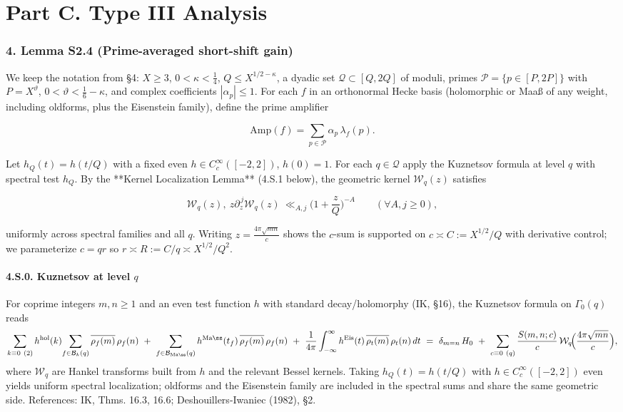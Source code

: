 \documentclass[11pt]{article}
\theoremstyle{definition}
\theoremstyle{remark}
\begin{document}
\part*{Part C. Type III Analysis}

\section*{4. Lemma S2.4 (Prime-averaged short-shift gain)}
We keep the notation from §4: $X\ge 3$, $0<\kappa<\tfrac14$, $Q\le X^{1/2-\kappa}$, a dyadic set $\mathcal Q\subset[Q,2Q]$ of moduli, primes $\mathcal P=\{p\in[P,2P]\}$ with $P=X^\vartheta$, $0<\vartheta<\tfrac16-\kappa$, and complex coefficients $|\alpha_p|\le 1$. For each $f$ in an orthonormal Hecke basis (holomorphic or Maaß of any weight, including oldforms, plus the Eisenstein family), define the prime amplifier

$$
\mathrm{Amp}(f)=\sum_{p\in\mathcal P}\alpha_p\,\lambda_f(p).
$$

Let $h_Q(t)=h(t/Q)$ with a fixed even $h\in C_c^\infty([-2,2])$, $h(0)=1$. For each $q\in\mathcal Q$ apply the Kuznetsov formula at level $q$ with spectral test $h_Q$. By the **Kernel Localization Lemma** (4.S.1 below), the geometric kernel $\mathcal W_q(z)$ satisfies

$$
\mathcal W_q(z),\ z\partial_z^{\,j}\mathcal W_q(z)\ \ll_{A,j}\Big(1+\frac zQ\Big)^{-A}\qquad(\forall A,j\ge0),
$$

uniformly across spectral families and all $q$. Writing $z=\frac{4\pi\sqrt{mn}}{c}$ shows the $c$-sum is supported on $c\asymp C:=X^{1/2}/Q$ with derivative control; we parameterize $c=qr$ so $r\asymp R:=C/q\asymp X^{1/2}/Q^2$.

\subsection*{4.S.0. Kuznetsov at level $q$}
For coprime integers $m,n\ge 1$ and an even test function $h$ with standard decay/holomorphy (IK, §16), the Kuznetsov formula on $\Gamma_0(q)$ reads
\[
\sum_{k\equiv 0\ (2)} h^{\mathrm{hol}}(k)\!\sum_{f\in\mathcal B_k(q)} \overline{\rho_f(m)}\,\rho_f(n)
\ +\ \sum_{f\in\mathcal B_{\mathrm{Ma\ss}}(q)} h^{\mathrm{Ma\ss}}(t_f)\,\overline{\rho_f(m)}\,\rho_f(n)
\ +\ \frac{1}{4\pi}\int_{-\infty}^{\infty} h^{\mathrm{Eis}}(t)\,\overline{\rho_t(m)}\,\rho_t(n)\,dt
\ =\ \delta_{m=n}\,H_0\ +\ \sum_{c\equiv 0\ (q)} \frac{S(m,n;c)}{c}\,\mathcal W_q\!\Big(\frac{4\pi\sqrt{mn}}{c}\Big),
\]
where $\mathcal W_q$ are Hankel transforms built from $h$ and the relevant Bessel kernels. Taking $h_Q(t)=h(t/Q)$ with $h\in C_c^\infty([-2,2])$ even yields uniform spectral localization; oldforms and the Eisenstein family are included in the spectral sums and share the same geometric side. References: IK, Thms. 16.3, 16.6; Deshouillers-Iwaniec (1982), §2.
\end{document}
